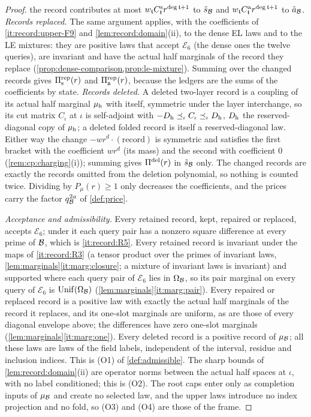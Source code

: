 \begin{proof}
the record contributes at most $w_{\mathfrak t}C^{\rm s}_{\mathfrak t}r^{\deg\mathfrak t+1}$
to $\tilde s_\Blk$ and $w_{\mathfrak t}C^{\rm a}_{\mathfrak t}r^{\deg\mathfrak t+1}$ to
$\tilde a_\Blk$. \emph{Records replaced.} The same argument applies, with the
coefficients of \ref{it:record:upper-F9} and \cref{lem:record:domain}(ii), to the
dense EL laws and to the LE mixtures: they are positive laws that accept
$\mathcal E_6$ (the dense ones the twelve queries), are invariant and have the
actual half marginals of the record they replace
(\cref{prop:dense-comparison,prop:le-mixture}). Summing over the changed records
gives $\Pi^{\rm rep}_{\rm s}(r)$ and $\Pi^{\rm rep}_{\rm a}(r)$, because the ledgers
are the sums of the coefficients by state. \emph{Records deleted.} A
deleted two-layer record is a coupling of its actual half marginal
$\mu_{\rm h}$ with itself, symmetric under the layer interchange, so its cut
matrix $C_\iota$ at $\iota$ is self-adjoint with
$-D_{\rm h}\preceq_\iota C_\iota\preceq_\iota D_{\rm h}$, $D_{\rm h}$ the
reserved-diagonal copy of $\mu_{\rm h}$; a deleted folded record is itself a
reserved-diagonal law. Either way the change $-wr^d\cdot(\text{record})$ is
symmetric and satisfies the first bracket with the coefficient $wr^d$ (its
mass) and the second with coefficient $0$ (\cref{rem:cp:charging}(i)); summing gives
$\Pi^{\rm del}(r)$ in $\tilde s_\Blk$ only. The changed records are exactly the
records omitted from the deletion polynomial, so nothing is counted twice.
Dividing by $P_\mu(r)\ge1$ only decreases the coefficients, and the prices carry
the factor $q_\Blk^{2a}$ of \cref{def:price}.

\emph{Acceptance and admissibility.} Every retained record, kept, repaired or
replaced, accepts $\mathcal E_6$; under it each query pair has a nonzero square
difference at every prime of $\Blk$, which is \ref{it:record:R5}. Every retained
record is invariant under the maps of \ref{it:record:R3} (a tensor product over the
primes of invariant laws, \cref{lem:marginals}\ref{it:marg:closure}; a mixture of
invariant laws is invariant) and supported where each query pair of
$\mathcal E_6$ lies in $\Om[\Blk]$, so its pair marginal on every query of
$\mathcal E_6$ is $\Unif(\Om[\Blk])$ (\cref{lem:marginals}\ref{it:marg:pair}). Every
repaired or replaced record is a positive law with exactly the actual half
marginals of the record it replaces, and its one-slot marginals are uniform, as are
those of every diagonal envelope above; the differences have zero one-slot
marginals (\cref{lem:marginals}\ref{it:marg:one}). Every deleted record is a positive record
of $\mu_\Blk$; all these laws are laws of the field labels, independent of the
interval, residue and inclusion indices. This is (O1) of \cref{def:admissible}. The
sharp bounds of \cref{lem:record:domain}(ii) are operator norms between the actual
half spaces at $\iota$, with no label conditioned; this is (O2). The root caps enter
only as completion inputs of $\mu_\Blk$ and create no selected law, and the upper
laws introduce no index projection and no fold, so (O3) and (O4) are those of the
frame.


\end{proof}
